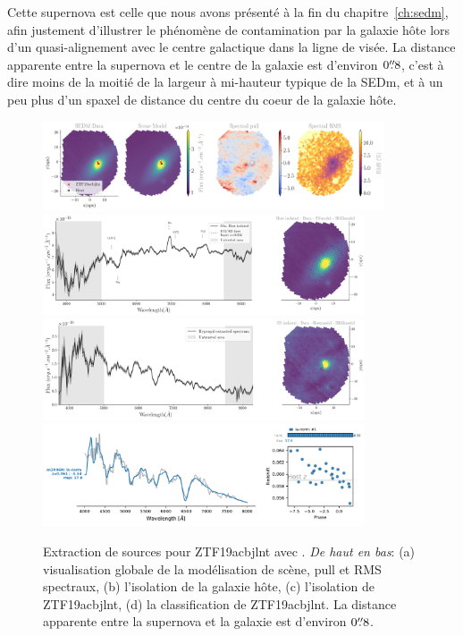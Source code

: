 \documentclass[../main/main.tex]{subfiles}
\begin{document}
Cette supernova est celle que nous avons présenté à la fin du
chapitre~\ref{ch:sedm}, afin justement d'illustrer le phénomène de
contamination par la galaxie hôte lors d'un quasi-alignement avec le centre
galactique dans la ligne de visée. La distance apparente entre la
supernova et le centre de la galaxie est d'environ $0\overset{\prime\prime}{.}8$, c'est à dire moins de la moitié
de la largeur à mi-hauteur typique de la SEDm, et à un peu plus d'un spaxel
de distance du centre du coeur de la galaxie hôte.
\begin{figure}[ht]
  \centering
  \includegraphics[width=0.9\textwidth]{../figures/07_scene/scene_rmspull_ZTF19acbjlnt.png}
  \includegraphics[width=0.85\textwidth]{../figures/07_scene/output_host_ZTF19acbjlnt.png}
  \includegraphics[width=0.85\textwidth]{../figures/07_scene/output_target_ZTF19acbjlnt.png}
  \includegraphics[width=0.85\textwidth]{../figures/07_scene/ZTF19acbjlnt_snid_typing.pdf}
  \caption[Extraction de sources pour ZTF19acbjlnt.]{Extraction de
    sources pour ZTF19acbjlnt avec \hypergal. \emph{De haut en bas}:
    (a) visualisation globale de la modélisation de scène, pull et RMS
    spectraux, (b) l'isolation de la galaxie hôte, (c) l'isolation de
    ZTF19acbjlnt, (d) la classification de ZTF19acbjlnt. La distance apparente entre la
supernova et la galaxie est d'environ $0\overset{\prime\prime}{.}8$.}
  \label{}
\end{figure}
\end{document}
